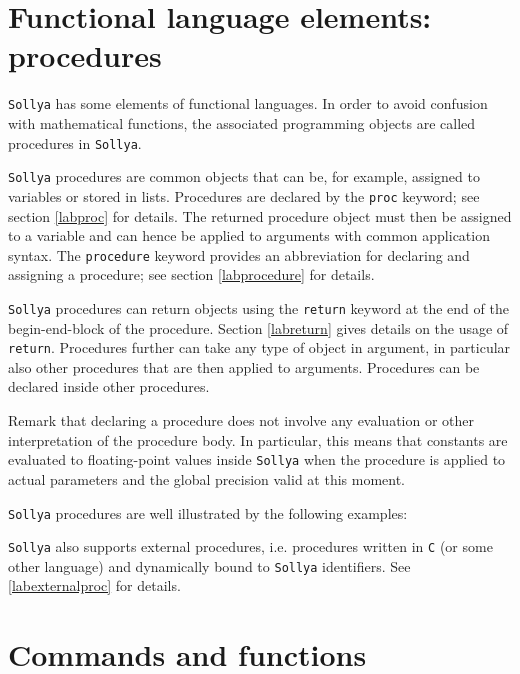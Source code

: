 \documentclass[a4paper]{article}
\newcommand{\key}[1]{\texttt{#1}}
\newcommand{\sollya}{\texttt{Sollya}\xspace}
\begin{document}


\section{Functional language elements: procedures}

\sollya has some elements of functional languages. In order to 
avoid confusion with mathematical functions, the associated 
programming objects are called procedures in \sollya. 

\sollya procedures are common objects that can be, for example,
assigned to variables or stored in lists. Procedures are declared by
the \key{proc} keyword; see section \ref{labproc} for details. The
returned procedure object must then be assigned to a variable and can
hence be applied to arguments with common application syntax. The
\key{procedure} keyword provides an abbreviation for declaring and
assigning a procedure; see section \ref{labprocedure} for details.

\sollya procedures can return objects using the \key{return} keyword
at the end of the begin-end-block of the procedure. Section
\ref{labreturn} gives details on the usage of \key{return}. Procedures
further can take any type of object in argument, in particular also
other procedures that are then applied to arguments. Procedures can
be declared inside other procedures. 

Remark that declaring a procedure does not involve any evaluation or
other interpretation of the procedure body. In particular, this means
that constants are evaluated to floating-point values inside \sollya
when the procedure is applied to actual parameters and the global
precision valid at this moment.

\sollya procedures are well illustrated by the following examples:



\sollya also supports external procedures, i.e. procedures written in
\texttt{C} (or some other language) and dynamically bound to \sollya
identifiers. See \ref{labexternalproc} for details.

\section{Commands and functions}


\end{document}

